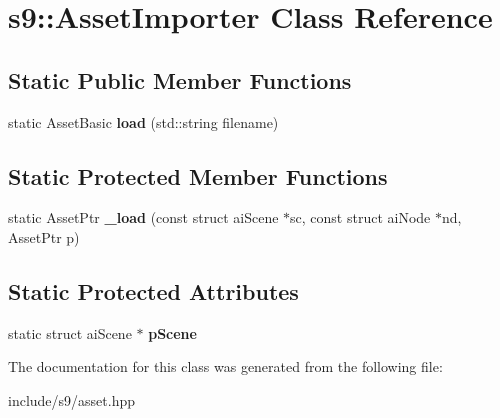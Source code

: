 \hypertarget{classs9_1_1AssetImporter}{\section{s9\-:\-:\-Asset\-Importer \-Class \-Reference}
\label{classs9_1_1AssetImporter}
}
\subsection*{\-Static \-Public \-Member \-Functions}
\begin{DoxyCompactItemize}
\item 
\hypertarget{classs9_1_1AssetImporter_a3aed72cd6c982c40a4002a96f9825777}{static \-Asset\-Basic {\bfseries load} (std\-::string filename)}\label{classs9_1_1AssetImporter_a3aed72cd6c982c40a4002a96f9825777}

\end{DoxyCompactItemize}
\subsection*{\-Static \-Protected \-Member \-Functions}
\begin{DoxyCompactItemize}
\item 
\hypertarget{classs9_1_1AssetImporter_a46925d052ba1f12b487610fcb1f1e70b}{static \-Asset\-Ptr {\bfseries \-\_\-load} (const struct ai\-Scene $\ast$sc, const struct ai\-Node $\ast$nd, \-Asset\-Ptr p)}\label{classs9_1_1AssetImporter_a46925d052ba1f12b487610fcb1f1e70b}

\end{DoxyCompactItemize}
\subsection*{\-Static \-Protected \-Attributes}
\begin{DoxyCompactItemize}
\item 
\hypertarget{classs9_1_1AssetImporter_a6c0a48dbb30f5dd3dd887b7f50db5f27}{static struct ai\-Scene $\ast$ {\bfseries p\-Scene}}\label{classs9_1_1AssetImporter_a6c0a48dbb30f5dd3dd887b7f50db5f27}

\end{DoxyCompactItemize}


\-The documentation for this class was generated from the following file\-:\begin{DoxyCompactItemize}
\item 
include/s9/asset.\-hpp\end{DoxyCompactItemize}
